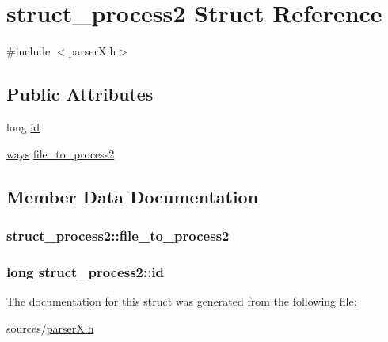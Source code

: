 \hypertarget{structstruct__process2}{\section{struct\-\_\-process2 Struct Reference}
\label{structstruct__process2}
}


{\ttfamily \#include $<$parser\-X.\-h$>$}

\subsection*{Public Attributes}
\begin{DoxyCompactItemize}
\item 
long \hyperlink{structstruct__process2_a2f25e259a5280b39006ad224da20505c}{id}
\item 
\hyperlink{structways}{ways} \hyperlink{structstruct__process2_a1fcdbf89a0f4341293f336de3a72500a}{file\-\_\-to\-\_\-process2}
\end{DoxyCompactItemize}


\subsection{Member Data Documentation}
\hypertarget{structstruct__process2_a1fcdbf89a0f4341293f336de3a72500a}{
\subsubsection[{file\-\_\-to\-\_\-process2}]{ struct\-\_\-process2\-::file\-\_\-to\-\_\-process2}}\label{structstruct__process2_a1fcdbf89a0f4341293f336de3a72500a}
\hypertarget{structstruct__process2_a2f25e259a5280b39006ad224da20505c}{
\subsubsection[{id}]{\setlength{\rightskip}{0pt plus 5cm}long struct\-\_\-process2\-::id}}\label{structstruct__process2_a2f25e259a5280b39006ad224da20505c}


The documentation for this struct was generated from the following file\-:\begin{DoxyCompactItemize}
\item 
sources/\hyperlink{parser_x_8h}{parser\-X.\-h}\end{DoxyCompactItemize}
